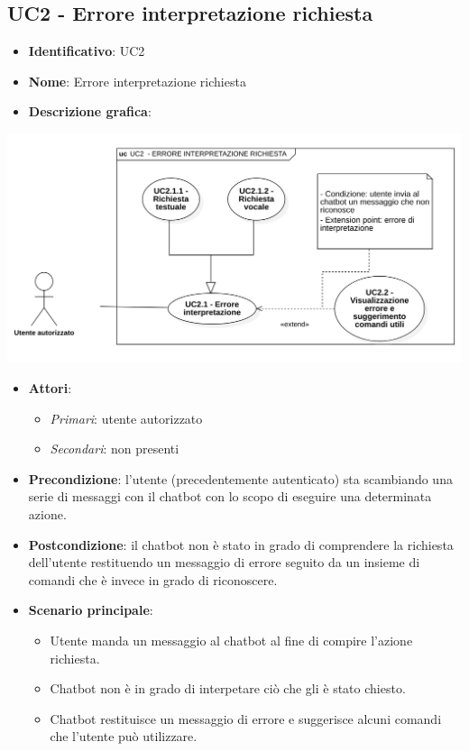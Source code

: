 \subsection{UC2 - Errore interpretazione richiesta}
\begin{itemize}
    \item \textbf{Identificativo}: UC2
    \item \textbf{Nome}: Errore interpretazione richiesta
    \item \textbf{Descrizione grafica}:
\end{itemize}

\begin{center}
    \includegraphics[scale=0.50]{images/UC2.png} 
\end{center}

\begin{itemize}
    \item \textbf{Attori}:
    \begin{itemize} 
        \item \textit{Primari}: utente autorizzato
        \item \textit{Secondari}: non presenti
    \end{itemize}
 \item \textbf{Precondizione}: l'utente (precedentemente autenticato) sta scambiando una serie di messaggi con il chatbot con lo scopo di eseguire una determinata azione.
 \item \textbf{Postcondizione}: il chatbot non è stato in grado di comprendere la richiesta dell'utente restituendo un messaggio di errore seguito da un insieme di comandi che è invece in grado di riconoscere.   
 \item \textbf{Scenario principale}: 
    \begin{itemize}
        \item Utente manda un messaggio al chatbot al fine di compire l'azione richiesta.
        \item Chatbot non è in grado di interpetare ciò che gli è stato chiesto.
        \item Chatbot restituisce un messaggio di errore e suggerisce alcuni comandi che l'utente può utilizzare.
    \end{itemize}
\end{itemize}
\newpage